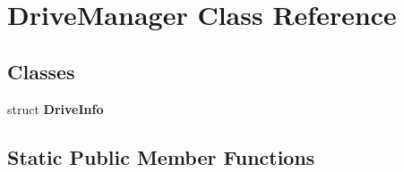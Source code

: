 \hypertarget{classDriveManager}{\section{Drive\-Manager Class Reference}
\label{classDriveManager}
}
\subsection*{Classes}
\begin{DoxyCompactItemize}
\item 
struct {\bfseries Drive\-Info}
\end{DoxyCompactItemize}
\subsection*{Static Public Member Functions}
